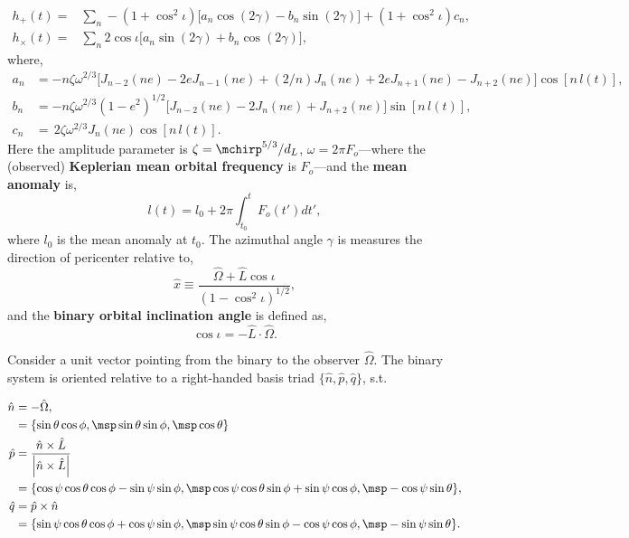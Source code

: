 \documentclass[10pt, oneside, onecolumn]{article}   	%
\begin{document}
        \begin{align}
        \label{eq:}
        h_{+}(t) = & \sum_n - (1 + \cos^2 \iota) \Big[ a_n \cos(2\gamma) - b_n \sin(2\gamma)\Big] + (1+\cos^2 \iota) c_n, \nonumber \\
        h_{\times}(t) = & \sum_n 2\cos \iota \Big[a_n \sin(2\gamma) + b_n \cos(2\gamma)\Big],
        \end{align}
        where,
        \begin{align}
        \label{eq:}
        a_n & = -n\zeta \omega^{2/3}\bigg[J_{n-2}(ne) - 2eJ_{n-1}(ne) + (2/n)J_n(ne) + 2 e J_{n+1}(ne) - J_{n+2}(ne)\bigg]\cos\left[n \, l(t)\right], \nonumber \\
        b_n & = -n\zeta \omega^{2/3} (1 - e^2)^{1/2}\bigg[J_{n-2}(ne) - 2J_n (ne) + J_{n+2}(ne)\bigg]\sin\left[n \, l(t)\right], \\
        c_n & = \, 2 \zeta \omega^{2/3} J_n (ne)\cos\left[n \, l (t)\right]. \nonumber
        \end{align}
        Here the amplitude parameter is $\zeta = \mchirp^{5/3} / d_L$, $\omega = 2 \pi F_o$---where the (observed) \textbf{Keplerian mean orbital frequency} is $F_o$---and the \textbf{mean anomaly} is,
        \begin{equation}
        l(t) = l_0 + 2\pi \int_{t_0}^{t} F_o(t') dt',
        \end{equation}
        where $l_0$ is the mean anomaly at $t_0$.  The azimuthal angle $\gamma$ is measures the direction of pericenter relative to,
        \begin{equation}
        \hat{x} \equiv \frac{\hat{\Omega} + \hat{L} \cos \iota}{\left(1 - \cos^2 \iota\right)^{1/2}},
        \end{equation}
        and the \textbf{binary orbital inclination angle} is defined as,
        \begin{equation}
        \cos \iota = - \hat{L} \cdot \hat{\Omega}.
        \end{equation}

        Consider a unit vector pointing from the binary to the observer $\hat{\Omega}$.  The binary system is oriented relative to a right-handed basis triad $\{\hat{n}, \hat{p}, \hat{q}\}$, s.t.

        \begin{align}
        \hat{n} & = - \hat{\Omega}, \nonumber \\
        & = \{\sin \theta \cos \phi,\msp  \sin\theta \sin \phi, \msp \cos\theta  \} \nonumber \\
        \hat{p} & = \frac{\hat{n} \times \hat{L}}{\left| \hat{n} \times \hat{L}\right|} \\
        & = \{\cos\psi\cos\theta\cos\phi - \sin\psi\sin\phi , \msp
        \cos\psi\cos\theta\sin\phi + \sin\psi\cos\phi, \msp
        -\cos\psi\sin\theta\}, \nonumber \\
        \hat{q} & = \hat{p} \times \hat{n} \nonumber \\
        & = \{\sin\psi \cos\theta \cos\phi + \cos\psi \sin\phi,
        \msp \sin\psi \cos\theta \sin\phi - \cos\psi \cos\phi,
        \msp -\sin\psi \sin\theta \}. \nonumber
        \end{align}
\end{document}

